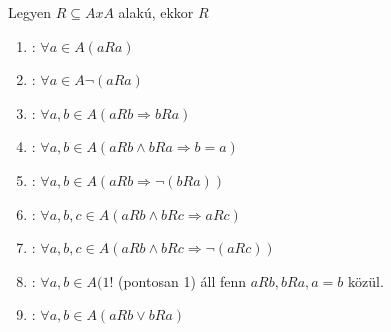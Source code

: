 \begin{frame}
\begin{tcolorbox}[title={Def.: Homogén binér relációk tulajdonságai}]
Legyen $R \subseteq A x A$ alakú, ekkor $R$\\
\begin{enumerate}
\item {}: ${\forall}a \in A (a R a)$
\item {}: ${\forall}a \in A {\neg}(a R a)$
\item {}: ${\forall}a, b \in A (a R b \Rightarrow b R a)$
\item {}: ${\forall}a, b \in A (a R b \land b R a \Rightarrow b = a)$
\item {}: ${\forall}a, b \in A (a R b \Rightarrow {\neg}(b R a))$
\item {}: ${\forall}a, b, c \in A (a R b \land b R c \Rightarrow a R c)$
\item {}: ${\forall}a, b, c \in A (a R b \land b R c \Rightarrow {\neg}(a R c))$
\item {}: ${\forall}a, b \in A (1!$ (pontosan 1) áll fenn $a R b, b R a, a = b$ közül.
\item {}: ${\forall}a, b \in A (a R b \lor b R a)$
\end{enumerate}
\end{tcolorbox}
\end{frame}

